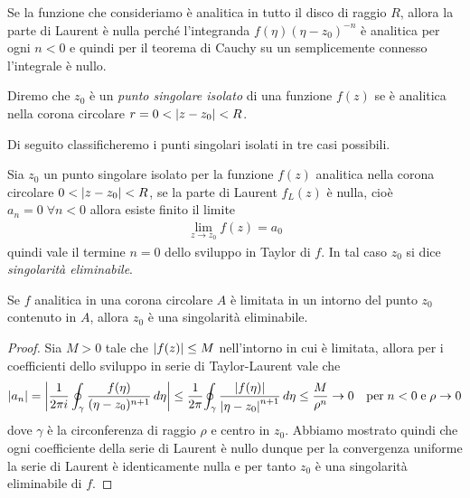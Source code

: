 Se la funzione che consideriamo è analitica in tutto il disco di raggio $ R $, allora la parte di Laurent è nulla 
perché l'integranda $ f(\eta)(\eta - z_0)^{-n} $ è analitica per ogni $ n < 0 $ e quindi per il teorema di Cauchy su un semplicemente connesso 
l'integrale è nullo.

\begin{definition}
  Diremo che $ z_0 $ è un \textit{punto singolare isolato} di una funzione $ f(z) $ se è analitica nella corona circolare $ r = 0 < \left|{z - z_0}\right| < R $.
\end{definition}

Di seguito classificheremo i punti singolari isolati in tre casi possibili.

\begin{definition}
  Sia $ z_0 $ un punto singolare isolato per la funzione $ f(z) $ analitica nella corona circolare $ 0 < \left|{z - z_0}\right| < R $, se
  la parte di Laurent $ f_L(z) $ è nulla, cioè $ a_n = 0 \; \forall n < 0 $ allora esiste finito il limite
  \begin{align}
    \lim_{z \to z_0} f(z) = a_0
  \end{align}
  quindi vale il termine $ n = 0 $ dello sviluppo in Taylor di $ f $. In tal caso $ z_0 $ si dice \textit{singolarità eliminabile}.
\end{definition}

\begin{theorem}[  ] \label{thm: analitica limitata allora la singolarità è eliminabile}
  Se $ f $ analitica in una corona circolare $ A $ è limitata in un intorno del punto $ z_0 $ contenuto in $ A $, allora $ z_0 $ è una singolarità 
  eliminabile.
\end{theorem}
\begin{proof}
  Sia $ M > 0 $ tale che $ \left|{f(z)}\right| \leq M $ nell'intorno in cui è limitata, allora per i coefficienti dello sviluppo in serie di Taylor-Laurent vale che 
  \begin{align}
    \left|{a_n}\right| = \left|{\frac1{2\pi i} \oint_\gamma \frac{f(\eta)}{(\eta - z_0)^{n+1}} \,d\eta }\right| 
    \leq \frac1{2\pi} {\oint_\gamma \frac{\left|{f(\eta)}\right|}{\left|{\eta - z_0}\right|^{n+1}} \,d\eta} 
    \leq \frac{M}{\rho^{n}} \to 0 \quad \textnormal{per} \; n < 0 \; \textnormal{e} \; \rho \to 0
  \end{align}
  dove $ \gamma $ è la circonferenza di raggio $ \rho $ e centro in $ z_0 $. Abbiamo mostrato quindi che ogni coefficiente della serie di Laurent 
  è nullo dunque per la convergenza uniforme la serie di Laurent è identicamente nulla e per tanto $ z_0 $ è una singolarità eliminabile di $ f $.
\end{proof}

